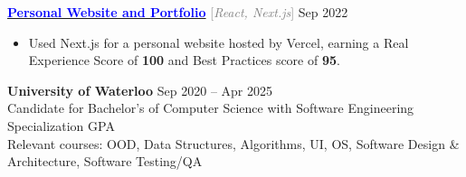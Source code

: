 \documentclass[9pt]{developercv} %
\begin{document}
\begin{minipage}[t]{\textwidth}
	\textbf{\href{https://henryhu.dev}{\textcolor{blue}{Personal Website and Portfolio}}} \quad \textcolor{gray}{[\;\textit{React, Next.js}\;]} \hfill Sep 2022
	\begin{itemize}[noitemsep,topsep=0pt]
		\item Used Next.js for a personal website hosted by Vercel, earning a Real Experience Score of \textbf{100} and Best Practices score of \textbf{95}.
	\end{itemize}
	\vspace{0.3em}

\end{minipage}



\begin{minipage}[t]{\textwidth}
	\vspace{-\baselineskip}
	\textbf{University of Waterloo} \hfill Sep 2020 -- Apr 2025 \\
	Candidate for Bachelor's of Computer Science with Software Engineering Specialization  GPA \\
	Relevant courses: OOD, Data Structures, Algorithms, UI, OS, Software Design \& Architecture, Software Testing/QA
\end{minipage}
\end{document}
